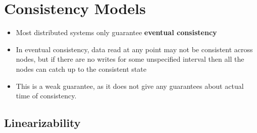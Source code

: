 \documentclass{article}
\begin{document}
\section{Consistency Models}
\begin{itemize}
    \item Most distributed systems only guarantee \textbf{eventual consistency} 
    \item In eventual consistency, data read at any point may not be consistent across nodes, but if there are no writes for some unspecified interval then all the nodes can catch up to the consistent state
    
    \item This is a weak guarantee, as it does not give any guarantees about actual time of consistency. 
\end{itemize}
\subsection{Linearizability}
\end{document}
